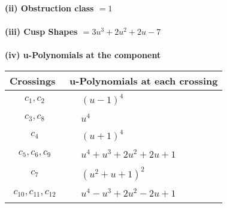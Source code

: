 \documentclass[1p]{elsarticle_modified}
\theoremstyle{definition}
\begin{document}
\flushleft \textbf{(ii) Obstruction class $= 1$}\\~\\
\flushleft \textbf{(iii) Cusp Shapes $= 3 u^3+2 u^2+2 u-7$}\\~\\
\newpage\renewcommand{\arraystretch}{1}
\flushleft \textbf{(iv) u-Polynomials at the component}\newline \\
\begin{tabular}{m{50pt}|m{274pt}}
Crossings & \hspace{64pt}u-Polynomials at each crossing \\
\hline $$\begin{aligned}c_{1},c_{2}\end{aligned}$$&$\begin{aligned}
&(u-1)^4
\end{aligned}$\\
\hline $$\begin{aligned}c_{3},c_{8}\end{aligned}$$&$\begin{aligned}
&u^4
\end{aligned}$\\
\hline $$\begin{aligned}c_{4}\end{aligned}$$&$\begin{aligned}
&(u+1)^4
\end{aligned}$\\
\hline $$\begin{aligned}c_{5},c_{6},c_{9}\end{aligned}$$&$\begin{aligned}
&u^4+u^3+2 u^2+2 u+1
\end{aligned}$\\
\hline $$\begin{aligned}c_{7}\end{aligned}$$&$\begin{aligned}
&(u^2+u+1)^2
\end{aligned}$\\
\hline $$\begin{aligned}c_{10},c_{11},c_{12}\end{aligned}$$&$\begin{aligned}
&u^4- u^3+2 u^2-2 u+1
\end{aligned}$\\
\hline
\end{tabular}\\~\\
\end{document}

